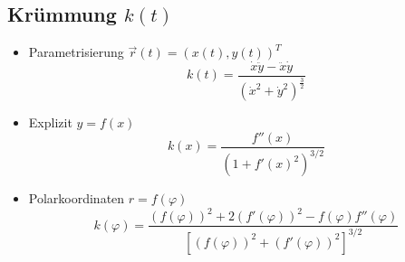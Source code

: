 \subsection{Krümmung \hfill $k(t)$}
    \begin{itemize}
        \item Parametrisierung $\vec{r}(t) = (x(t),y(t))^T$
            $$
                k(t) = \frac{\dot{x} \ddot{y} - \ddot{x} \dot{y}}{\left( \dot{x}^2 + \dot{y}^2 \right)^{\frac{3}{2}}}
            $$
        \item Explizit $y=f(x)$
            $$
                k(x) = \frac{f''(x)}{(1+f'(x)^2)^{3/2}}
            $$
        \item Polarkoordinaten $r=f(\varphi)$
            $$
                k(\varphi) = \frac{(f(\varphi))^2 + 2(f'(\varphi))^2-f(\varphi)f''(\varphi)}{\left[(f(\varphi))^2 + (f'(\varphi))^2\right]^{3/2}}
            $$
    \end{itemize}